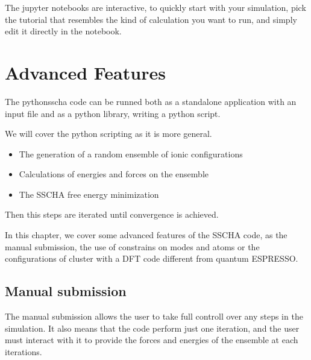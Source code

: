 \documentclass[a4paper,11pt,english]{sphinxmanual}
\begin{document}
\sphinxAtStartPar
The jupyter notebooks are interactive, to quickly start with your simulation, pick the tutorial that resembles the kind of calculation you want to run, and simply edit it directly in the notebook.

\sphinxstepscope


\chapter{Advanced Features}
\label{\detokenize{advanced:advanced-features}}\label{\detokenize{advanced::doc}}
\sphinxAtStartPar
The python\sphinxhyphen{}sscha code can be runned both as a stand\sphinxhyphen{}alone application with an input file and as a python library, writing a python script.

\sphinxAtStartPar
We will cover the python scripting as it is more general.
\begin{description}
\begin{itemize}
\item {} 
\sphinxAtStartPar
The generation of a random ensemble of ionic configurations

\item {} 
\sphinxAtStartPar
Calculations of energies and forces on the ensemble

\item {} 
\sphinxAtStartPar
The SSCHA free energy minimization

\end{itemize}

\end{description}

\sphinxAtStartPar
Then this steps are iterated until convergence is achieved.

\sphinxAtStartPar
In this chapter, we cover some advanced features of the SSCHA code, as the manual submission, the use of constrains on modes and atoms or the configurations of cluster with a DFT code different from quantum ESPRESSO.


\section{Manual submission}
\label{\detokenize{advanced:manual-submission}}
\sphinxAtStartPar
The manual submission allows the user to take full controll over any steps in the simulation. It also means that the code perform just one iteration, and the user must interact with it to provide the forces and energies of the ensemble at each iterations.
\end{document}
